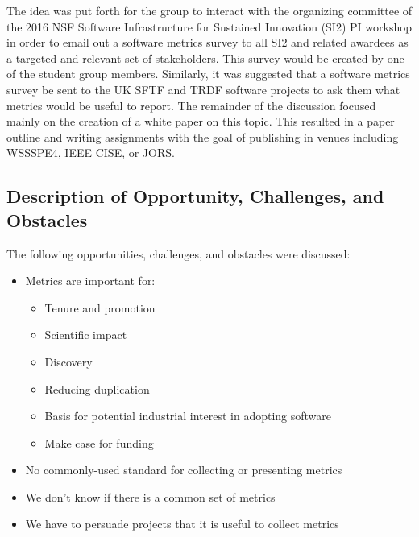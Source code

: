 \smallskip
\noindent
The idea was put forth for the group to interact with the organizing committee of the 2016 NSF Software Infrastructure for Sustained Innovation (SI2) PI workshop in order to email out a software metrics survey to all SI2 and related awardees as a targeted and relevant set of stakeholders.  This survey would be created by one of the student group members.  Similarly, it was suggested that a software metrics survey be sent to the UK SFTF and TRDF software projects to ask them what metrics would be useful to report.  The remainder of the discussion focused mainly on the creation of a white paper on this topic.  This resulted in a paper outline and writing assignments with the goal of publishing in venues including WSSSPE4, IEEE CISE, or JORS.



\subsection{Description of Opportunity, Challenges, and Obstacles}

The following opportunities, challenges, and obstacles were discussed:

\begin{itemize}
\item
Metrics are important for:

\begin{itemize}
\item
        Tenure and promotion

\item
        Scientific impact

\item
        Discovery

\item
        Reducing duplication

\item
        Basis for potential industrial interest in adopting software

\item
        Make case for funding
\end{itemize}

\item
No commonly-used standard for collecting or presenting metrics

\item
We don't know if there is a common set of metrics

\item
We have to persuade projects that it is useful to collect metrics

\end{itemize}



